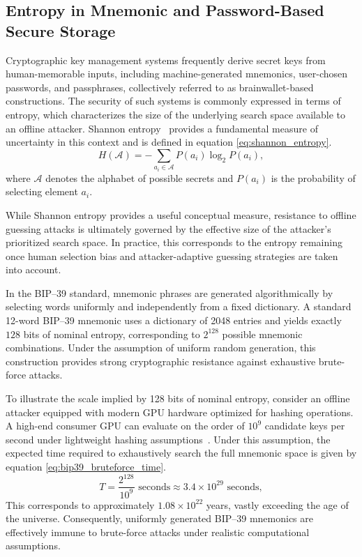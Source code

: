 \documentclass[journal,article,accept,pdftex,moreauthors]{Definitions/mdpi}
\begin{document}
\subsection{Entropy in Mnemonic and Password-Based Secure Storage}

Cryptographic key management systems frequently derive secret keys from human-memorable inputs, including machine-generated mnemonics, user-chosen passwords, and passphrases, collectively referred to as brainwallet-based constructions. The security of such systems is commonly expressed in terms of entropy, which characterizes the size of the underlying search space available to an offline attacker. Shannon entropy~\cite{Shannon1948} provides a fundamental measure of uncertainty in this context and is defined in equation \ref{eq:shannon_entropy}.
\begin{equation}
H(\mathcal{A}) = -\sum_{a_i \in \mathcal{A}} P(a_i)\log_2 P(a_i),
\label{eq:shannon_entropy}
\end{equation}
where $\mathcal{A}$ denotes the alphabet of possible secrets and $P(a_i)$ is the probability of selecting element $a_i$.

While Shannon entropy provides a useful conceptual measure, resistance to offline guessing attacks is ultimately governed by the effective size of the attacker’s prioritized search space. In practice, this corresponds to the entropy remaining once human selection bias and attacker-adaptive guessing strategies are taken into account.

In the BIP--39 standard, mnemonic phrases are generated algorithmically by selecting words uniformly and independently from a fixed dictionary. A standard 12-word BIP--39 mnemonic uses a dictionary of 2048 entries and yields exactly \(128\) bits of nominal entropy, corresponding to \(2^{128}\) possible mnemonic combinations. Under the assumption of uniform random generation, this construction provides strong cryptographic resistance against exhaustive brute-force attacks.

To illustrate the scale implied by 128 bits of nominal entropy, consider an offline attacker equipped with modern GPU hardware optimized for hashing operations. A high-end consumer GPU can evaluate on the order of $10^{9}$ candidate keys per second under lightweight hashing assumptions~\cite{Choi2024,Qiu2016,Durmuth2015}. Under this assumption, the expected time required to exhaustively search the full mnemonic space is given by equation \ref{eq:bip39_bruteforce_time}.
\begin{equation}
T = \frac{2^{128}}{10^{9}} \text{ seconds} \approx 3.4 \times 10^{29} \text{ seconds},
\label{eq:bip39_bruteforce_time}
\end{equation}
This corresponds to approximately $1.08 \times 10^{22}$ years, vastly exceeding the age of the universe. Consequently, uniformly generated BIP--39 mnemonics are effectively immune to brute-force attacks under realistic computational assumptions.
\end{document}
